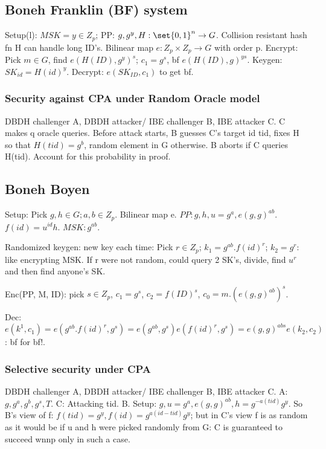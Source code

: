 \documentclass[oneside, article]{memoir}
\begin{document}
\subsection{Boneh Franklin (BF) system}
Setup(l): $MSK = y \in Z_{p}$; PP: $g, g^{y}, H: \set{0,1}^{n} \to G$. Collision resistant hash fn H can handle long ID's. Bilinear map $e: Z_{p} \times Z_{p} \to G$ with order p. Encrypt: Pick $m \in G$, find $e(H(ID), g^{y})^{s}$; $c_{1}= g^{s}$, bf $e(H(ID), g)^{ys}$. Keygen: $SK_{id} = H(id)^{y}$. Decrypt: $e(SK_{ID}, c_{1})$ to get bf.

\subsubsection{Security against CPA under Random Oracle model}
DBDH challenger A, DBDH attacker/ IBE challenger B, IBE attacker C. C makes q oracle queries. Before attack starts, B guesses C's target id tid, fixes H so that $H(tid) = g^{b}$, random element in G otherwise. B aborts if C queries H(tid). Account for this probability in proof.

\subsection{Boneh Boyen}
Setup: Pick $g, h \in G; a, b \in Z_{p}$. Bilinear map e. $PP: g, h, u = g^{a}, e(g,g)^{ab}$. $f(id) = u^{id}h$. $MSK: g^{ab}$.

Randomized keygen: new key each time: Pick $r \in Z_{p}$; $k_{1} = g^{ab}.f(id)^{r}$; $k_{2} = g^{r}$: like encrypting MSK. If r were not random, could query 2 SK's, divide, find $u^{r}$ and then find anyone's SK.

Enc(PP, M, ID): pick $s\in Z_{p}$, $c_{1} = g^{s}$, $c_{2} = f(ID)^{s}$, $c_{0} = m.(e(g,g)^{ab})^{s}$.

Dec: \\
$e(k^{1}, c_{1})  = e(g^{ab}.f(id)^{r}, g^{s}) = e(g^{ab}, g^{s}) e(f(id)^{r}, g^{s}) = e(g, g)^{abs} e(k_{2}, c_{2})$: bf for bf!.

\subsubsection{Selective security under CPA}
DBDH challenger A, DBDH attacker/ IBE challenger B, IBE attacker C. A: $g, g^{a}, g^{b}, g^{s}, T$. C: Attacking tid. B. Setup: $g, u = g^{a}, e(g, g)^{ab}, h = g^{-a(tid)}g^{y}$. So  B's view of f: $f(tid) = g^{y}, f(id) = g^{a(id-tid)}g^{y}$; but in C's view f is as random as it would be if u and h were picked randomly from G: C is guaranteed to succeed wnnp only in such a case.
\end{document}
